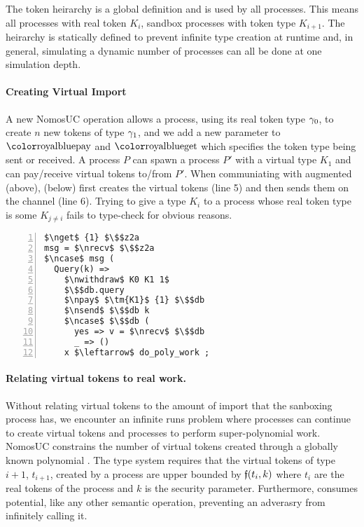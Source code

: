 The token heirarchy is a global definition and is used by all processes. 
This means all processes with real token $K_i$, sandbox processes with token type $K_{i+1}$.
The heirarchy is statically defined to prevent infinite type creation at runtime and, in general, simulating a dynamic number of processes can all be done at one simulation depth. 

\paragraph{Creating Virtual Import}
A new NomosUC operation  allows a process, using its real token type $\gamma_0$, to create $n$ new tokens of type $\gamma_1$, and we add a new parameter to $\npay$ and $\nget$ which specifies the token type being sent or received. 
A process $P$ can spawn a process $P'$ with a virtual type $K_1$ and can pay/receive virtual tokens to/from $P'$.
When communiating with augmented \Fdb (above), \Sim (below) first creates the virtual tokens (line 5) and then sends them on the channel (line 6).
Trying to give a type $K_i$ to a process whose real token type is some $K_{j \neq i}$ fails to type-check for obvious reasons.
\begin{lstlisting}[basicstyle=\scriptsize\BeraMonottFamily, frame=single, mathescape, numbers=left, xleftmargin=2em, xrightmargin=2em]
$\nget$ {1} $\$$z2a
msg = $\nrecv$ $\$$z2a
$\ncase$ msg (
  Query(k) => 
    $\nwithdraw$ K0 K1 1$
    $\$$db.query
    $\npay$ $\tm{K1}$ {1} $\$$db
    $\nsend$ $\$$db k
    $\ncase$ $\$$db (
      yes => v = $\nrecv$ $\$$db 
      _ => ()
    x $\leftarrow$ do_poly_work ;
\end{lstlisting}

\paragraph{Relating virtual tokens to real work.}
Without relating virtual tokens to the amount of import that the sanboxing process has, we encounter an infinite runs problem where processes can continue to create virtual tokens and processes to perform super-polynomial work.
NomosUC constrains the number of virtual tokens created through a globally known polynomial \GlobalF.
The type system requires that the virtual tokens of type $i+1$, $t_{i+1}$, created by a process are upper bounded by $\mathfrak{f}(t_i, k)$ where $t_i$ are the real tokens of the process and $k$ is the security parameter. 
Furthermore, \inline{$\nwithdraw$} consumes potential, like any other semantic operation, preventing an adverasry from infinitely calling it.

